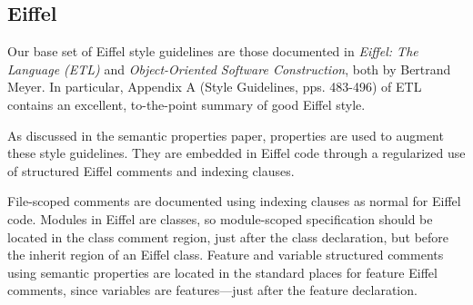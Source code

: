 \subsection{Eiffel}

Our base set of Eiffel style guidelines are those documented in \emph{Eiffel: The Language (ETL)} and \emph{Object-Oriented Software Construction}, both by Bertrand Meyer. In particular, Appendix A (Style Guidelines, pps. 483-496) of ETL contains an excellent, to-the-point summary of good Eiffel style.

As discussed in the semantic properties paper, properties are used to augment these style guidelines. They are embedded in Eiffel code through a regularized use of structured Eiffel comments and indexing clauses.

File-scoped comments are documented using indexing clauses as normal for Eiffel code. Modules in Eiffel are classes, so module-scoped specification should be located in the class comment region, just after the class declaration, but before the inherit region of an Eiffel class. Feature and variable structured comments using semantic properties are located in the standard places for feature Eiffel comments, since variables are features---just after the feature declaration.